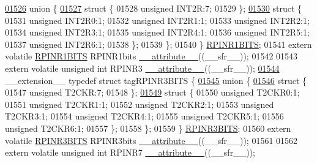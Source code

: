 \begin{DoxyCode}
\hypertarget{a00015_source_l01526}{}\hyperlink{a00015}{01526}   \textcolor{keyword}{union }\{
\hypertarget{a00015_source_l01527}{}\hyperlink{a00015}{01527}     \textcolor{keyword}{struct }\{
01528       \textcolor{keywordtype}{unsigned} INT2R:7;
01529     \};
\hypertarget{a00015_source_l01530}{}\hyperlink{a00015}{01530}     \textcolor{keyword}{struct }\{
01531       \textcolor{keywordtype}{unsigned} INT2R0:1;
01532       \textcolor{keywordtype}{unsigned} INT2R1:1;
01533       \textcolor{keywordtype}{unsigned} INT2R2:1;
01534       \textcolor{keywordtype}{unsigned} INT2R3:1;
01535       \textcolor{keywordtype}{unsigned} INT2R4:1;
01536       \textcolor{keywordtype}{unsigned} INT2R5:1;
01537       \textcolor{keywordtype}{unsigned} INT2R6:1;
01538     \};
01539   \};
01540 \} \hyperlink{a00014_d3/d3b/a00715}{RPINR1BITS};
01541 \textcolor{keyword}{extern} \textcolor{keyword}{volatile} \hyperlink{a00014_d3/d3b/a00715}{RPINR1BITS} RPINR1bits \hyperlink{a00015_a493c46f03454991ccc5aa7a6e1dfb2a7}{\_\_attribute\_\_}((\_\_sfr\_\_));
01542 
01543 \textcolor{keyword}{extern} \textcolor{keyword}{volatile} \textcolor{keywordtype}{unsigned} \textcolor{keywordtype}{int}  RPINR3 \hyperlink{a00015_a493c46f03454991ccc5aa7a6e1dfb2a7}{\_\_attribute\_\_}((\_\_sfr\_\_));
\hypertarget{a00015_source_l01544}{}\hyperlink{a00014}{01544} \_\_extension\_\_ \textcolor{keyword}{typedef} \textcolor{keyword}{struct }tagRPINR3BITS \{
\hypertarget{a00015_source_l01545}{}\hyperlink{a00015}{01545}   \textcolor{keyword}{union }\{
\hypertarget{a00015_source_l01546}{}\hyperlink{a00015}{01546}     \textcolor{keyword}{struct }\{
01547       \textcolor{keywordtype}{unsigned} T2CKR:7;
01548     \};
\hypertarget{a00015_source_l01549}{}\hyperlink{a00015}{01549}     \textcolor{keyword}{struct }\{
01550       \textcolor{keywordtype}{unsigned} T2CKR0:1;
01551       \textcolor{keywordtype}{unsigned} T2CKR1:1;
01552       \textcolor{keywordtype}{unsigned} T2CKR2:1;
01553       \textcolor{keywordtype}{unsigned} T2CKR3:1;
01554       \textcolor{keywordtype}{unsigned} T2CKR4:1;
01555       \textcolor{keywordtype}{unsigned} T2CKR5:1;
01556       \textcolor{keywordtype}{unsigned} T2CKR6:1;
01557     \};
01558   \};
01559 \} \hyperlink{a00014_dc/d85/a00736}{RPINR3BITS};
01560 \textcolor{keyword}{extern} \textcolor{keyword}{volatile} \hyperlink{a00014_dc/d85/a00736}{RPINR3BITS} RPINR3bits \hyperlink{a00015_a493c46f03454991ccc5aa7a6e1dfb2a7}{\_\_attribute\_\_}((\_\_sfr\_\_));
01561 
01562 \textcolor{keyword}{extern} \textcolor{keyword}{volatile} \textcolor{keywordtype}{unsigned} \textcolor{keywordtype}{int}  RPINR7 \hyperlink{a00015_a493c46f03454991ccc5aa7a6e1dfb2a7}{\_\_attribute\_\_}((\_\_sfr\_\_));

\end{DoxyCode}

